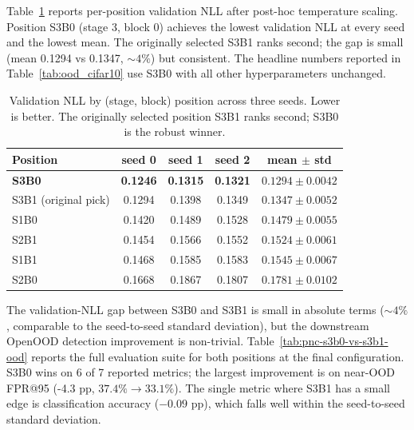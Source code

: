 Table~\ref{tab:pnc-position-sanity} reports per-position validation NLL after
post-hoc temperature scaling. Position S3B0 (stage 3, block 0) achieves the
lowest validation NLL at every seed and the lowest mean. The originally
selected S3B1 ranks second; the gap is small (mean 0.1294 vs 0.1347, ${\sim}4\%$)
but consistent. The headline numbers reported in
Table~\ref{tab:ood_cifar10} use S3B0 with all other hyperparameters unchanged.

\begin{table}[h]
\centering
\caption{Validation NLL by (stage, block) position across three seeds. Lower
is better. The originally selected position S3B1 ranks second; S3B0 is the
robust winner.}
\label{tab:pnc-position-sanity}
\small
\begin{tabular}{l c c c c}
\toprule
Position & seed 0 & seed 1 & seed 2 & mean $\pm$ std \\
\midrule
\textbf{S3B0} & \textbf{0.1246} & \textbf{0.1315} & \textbf{0.1321} & $\mathbf{0.1294 \pm 0.0042}$ \\
S3B1 (original pick) & 0.1294 & 0.1398 & 0.1349 & $0.1347 \pm 0.0052$ \\
S1B0 & 0.1420 & 0.1489 & 0.1528 & $0.1479 \pm 0.0055$ \\
S2B1 & 0.1454 & 0.1566 & 0.1552 & $0.1524 \pm 0.0061$ \\
S1B1 & 0.1468 & 0.1585 & 0.1583 & $0.1545 \pm 0.0067$ \\
S2B0 & 0.1668 & 0.1867 & 0.1807 & $0.1781 \pm 0.0102$ \\
\bottomrule
\end{tabular}
\end{table}

The validation-NLL gap between S3B0 and S3B1 is small in absolute terms
(${\sim}4\%$, comparable to the seed-to-seed standard deviation), but the
downstream OpenOOD detection improvement is non-trivial.
Table~\ref{tab:pnc-s3b0-vs-s3b1-ood} reports the full evaluation suite for
both positions at the final configuration. S3B0 wins on 6 of 7 reported
metrics; the largest improvement is on near-OOD FPR@95 (-4.3 pp,
$37.4\% \to 33.1\%$). The single metric where S3B1 has a small edge is
classification accuracy ($-0.09$ pp), which falls well within the
seed-to-seed standard deviation.

